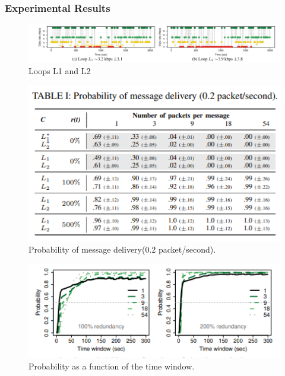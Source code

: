 \documentclass{beamer}
\begin{document}
\begin{frame}[fragile]
\frametitle{Experimental Results}
\begin{figure}
    \includegraphics[scale=0.5]{research-paper-image -5.PNG}
    \caption{Loops L1 and L2}
\end{figure}
\begin{figure}
    \includegraphics[scale=0.33]{research-paper-image -3.PNG}
    \caption{Probability of message delivery(0.2 packet/second).}
\end{figure}
\begin{figure}
    \includegraphics[scale=0.5]{research-paper-image -4.PNG}
    \caption{Probability as a function of the time window.}
\end{figure}
\end{frame}
\end{document}
